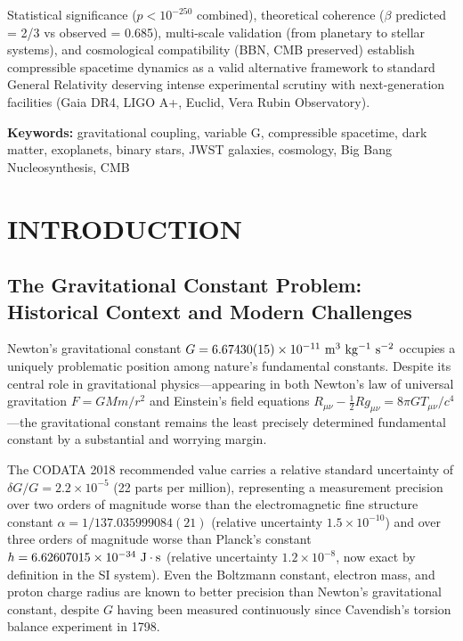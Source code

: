 \documentclass[11pt,a4paper]{article}
\begin{document}
Statistical significance (\(p < 10^{-250}\) combined), theoretical
coherence (\(\beta\) predicted = 2/3 vs observed = 0.685), multi-scale
validation (from planetary to stellar systems), and cosmological
compatibility (BBN, CMB preserved) establish compressible spacetime
dynamics as a valid alternative framework to standard General Relativity
deserving intense experimental scrutiny with next-generation facilities
(Gaia DR4, LIGO A+, Euclid, Vera Rubin Observatory).

\textbf{Keywords:} gravitational coupling, variable G, compressible
spacetime, dark matter, exoplanets, binary stars, JWST galaxies,
cosmology, Big Bang Nucleosynthesis, CMB

\hypertarget{introduction}{%
\section{INTRODUCTION}\label{introduction}}

\hypertarget{the-gravitational-constant-problem-historical-context-and-modern-challenges}{%
\subsection{The Gravitational Constant Problem: Historical
Context and Modern
Challenges}\label{the-gravitational-constant-problem-historical-context-and-modern-challenges}}

Newton's gravitational constant
\(G = 6.67430(15) \times 10^{-11}~{\rm m^3~kg^{-1}~s^{-2}}\) occupies a
uniquely problematic position among nature's fundamental constants.
Despite its central role in gravitational physics---appearing in both
Newton's law of universal gravitation \(F = GMm/r^2\) and Einstein's
field equations
\(R_{\mu\nu} - \frac{1}{2}Rg_{\mu\nu} = 8\pi G T_{\mu\nu}/c^4\)---the
gravitational constant remains the least precisely determined
fundamental constant by a substantial and worrying margin.

The CODATA 2018 recommended value carries a relative standard
uncertainty of \(\delta G/G = 2.2 \times 10^{-5}\) (22 parts per
million), representing a measurement precision over two orders of
magnitude worse than the electromagnetic fine structure constant
\(\alpha = 1/137.035999084(21)\) (relative uncertainty
\(1.5 \times 10^{-10}\)) and over three orders of magnitude worse than
Planck's constant \(h = 6.62607015 \times 10^{-34}~{\rm J \cdot s}\)
(relative uncertainty \(1.2 \times 10^{-8}\), now exact by definition in
the SI system). Even the Boltzmann constant, electron mass, and proton
charge radius are known to better precision than Newton's gravitational
constant, despite \(G\) having been measured continuously since
Cavendish's torsion balance experiment in 1798.
\end{document}
